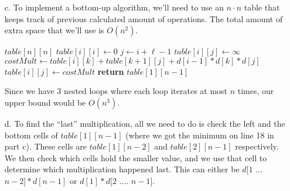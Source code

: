 \documentclass[11pt]{article}
\begin{document}
\begin{itemize}
\item[c.]
	To implement a bottom-up algorithm, we'll need to use an $n \cdot n$ table that keeps track of previous calculated amount of operations. The total amount of extra space that we'll use is $O(n^2)$.

\begin{algorithmic}[1]
	\State $table[n][n]$
		\State $table[i][i] \gets 0$
	\EndFor
			\State $j \gets i + \ell - 1$
			\State $table[i][j] \gets \infty$
				\State $costMult \gets table[i][k] + table[k+1][j] + d[i-1] * d[k] * d[j]$
					\State $table[i][j] \gets costMult$
				\EndIf
			\EndFor
		\EndFor
	\EndFor
	\State \textbf{return} $table[1][n-1]$
\EndFunction
\end{algorithmic}

	Since we have 3 nested loops where each loop iterates at most $n$ times, our upper bound would be $\boxed{O(n^3)}$.

\item[d.]
	To find the ``last'' multiplication, all we need to do is check the left and the bottom cells of $table[1][n-1]$ (where we got the minimum on line 18 in part c). These cells are $table[1][n-2]$ and $table[2][n-1]$ respectively. We then check which cells hold the smaller value, and we use that cell to determine which multiplication happened last. This can either be $d[1$ ... $n-2] * d[n-1]$ or $d[1] * d[2$ .... $n-1]$.

\end{itemize}
\end{document}
